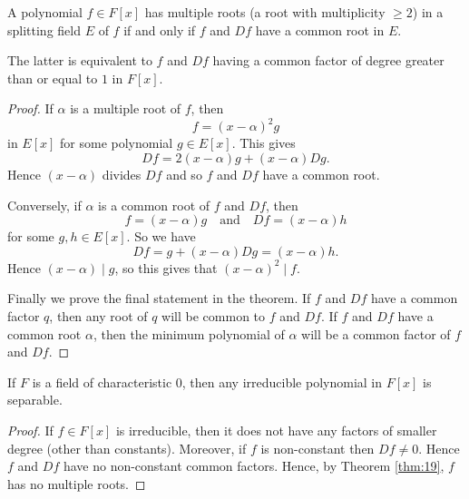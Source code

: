 \begin{theorem}\label{thm:19}
	A polynomial $f \in F[x]$ has multiple roots (a root with multiplicity $\geq 2$) in a splitting field $E$ of $f$ if and only if $f$ and $Df$ have a common root in $E$.
	
	The latter is equivalent to $f$ and $Df$ having a common factor of degree greater than or equal to $1$ in $F[x]$.
	\begin{proof}
		If $\alpha$ is a multiple root of $f$, then
		\[
			f = (x - \alpha)^2 g
		\]
		in $E[x]$ for some polynomial $g \in E[x]$. This gives
		\[
			Df = 2(x - \alpha)g + (x - \alpha) Dg.
		\]
		Hence $(x - \alpha)$ divides $Df$ and so $f$ and $Df$ have a common root.
		
		Conversely, if $\alpha$ is a common root of $f$ and $Df$, then
		\[
			f = (x - \alpha)g \quad \text{and} \quad Df = (x - \alpha)h
		\]
		for some $g, h \in E[x]$. So we have
		\[
			Df = g + (x - \alpha)Dg = (x - \alpha)h.
		\]
		Hence $(x - \alpha) \mid g$, so this gives that $(x - \alpha)^2 \mid f$.
		
		Finally we prove the final statement in the theorem. If $f$ and $Df$ have a common factor $q$, then any root of $q$ will be common to $f$ and $Df$. If $f$ and $Df$ have a common root $\alpha$, then the minimum polynomial of $\alpha$ will be a common factor of $f$ and $Df$.
	\end{proof}
\end{theorem}

\begin{corollary}\label{cor:to-thm-19}
	If $F$ is a field of characteristic 0, then any irreducible polynomial in $F[x]$ is separable.
	\begin{proof}
		If $f \in F[x]$ is irreducible, then it does not have any factors of smaller degree (other than constants). Moreover, if $f$ is non-constant then $Df \neq 0$. Hence $f$ and $Df$ have no non-constant common factors. Hence, by Theorem \ref{thm:19}, $f$ has no multiple roots.
	\end{proof}
\end{corollary}

